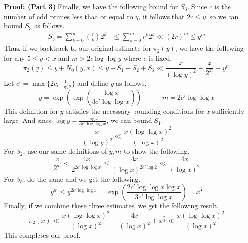 \begin{boxedsection}
    \textbf{Proof: (Part 3)} Finally, we have the following bound for $S_3$. Since $r$ is the number of odd primes less than or equal to $y$, it follows that $2r \leq y$, so we can bound $S_3$ as follows.
    \begin{align*}
        S_3 = \sum_{k=0}^m {r \choose k} 2^k &\leq \sum_{k=0}^m r^k 2^k \ll (2r)^m \leq y^m
    \end{align*}
    Thus, if we backtrack to our original estimate for $\pi_2(y)$, we have the following for any $5 \leq y < x$ and $m > 2c \log \log y$ where $c$ is fixed.
    $$
    \pi_2(y) \leq y + N_0(y,x) \leq y + S_1 - S_2 + S_3 \ll \frac{x}{(\log y)^2} + \frac{x}{2^m} + y^m
    $$
    Let $c' = \max\{2c, \frac{1}{\log 2}\}$ and define $y$ as follows.
    $$
    y = \exp\left(\exp\left(\frac{\log x}{3c'\log \log x}\right)\right) \quad \quad \quad m = 2c' \log \log x
    $$
    This definition for $y$ satisfies the necessary bounding conditions for $x$ sufficiently large. And since $\log y = \frac{\log x}{3c' \log \log x}$, we can bound $S_1$.
    $$
    \frac{x}{(\log y)^2} \ll \frac{x (\log \log x)^2}{(\log x)^2}
    $$
    For $S_2$, use our same definitions of $y,m$ to show the following.
    $$
    \frac{x}{2^m} < \frac{4x}{2^{2c' \log \log x}} \leq \frac{4x}{(\log x)^{2c' \log 2}} \ll \frac{4x}{(\log x)^2}
    $$
    For $S_3$, do the same and we get the following.
    $$
    y^m \leq y^{2c' \log \log x} = \exp\left(\frac{2c' \log \log x \log x}{3c' \log \log x}\right) = x^{\frac{2}{3}}
    $$
    Finally, if we combine these three estimates, we get the following result.
    $$
    \pi_2(x) \ll  \frac{x (\log \log x)^2}{(\log x)^2} +  \frac{4x}{(\log x)^2} + x^{\frac{2}{3}} \ll \frac{x (\log \log x)^2}{(\log x)^2}
    $$
    This completes our proof.
\end{boxedsection}



